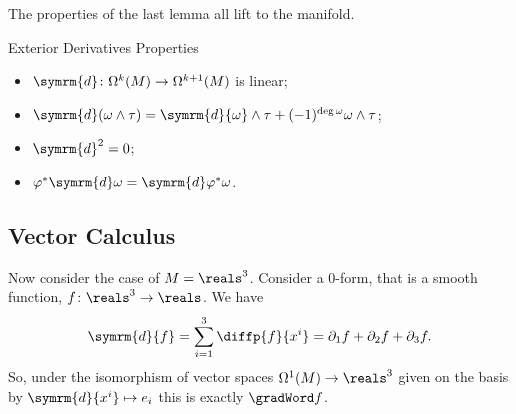 \documentclass[fleqn]{NotesClass}
\renewcommand{\dl}{\symrm{d}}
\begin{document}
    The properties of the last lemma all lift to the manifold.
    
    \begin{lma}{Exterior Derivatives Properties}{}
        \begin{itemize}
            \item \(\dl \colon \Omega^k(M) \to \Omega^{k + 1}(M)\) is linear;
            \item \(\dl(\omega \wedge \tau) = \dl{\omega} \wedge \tau + (-1)^{\deg \omega} \omega \wedge \tau\);
            \item \(\dl^2 = 0\);
            \item \(\varphi^*\dl\omega = \dl \varphi^*\omega\).
        \end{itemize}
    \end{lma}
    
    \subsection{Vector Calculus}
    Now consider the case of \(M = \reals^3\).
    Consider a 0-form, that is a smooth function, \(f \colon \reals^3 \to \reals\).
    We have
    \begin{equation}
        \dl{f} = \sum_{i=1}^{3} \diffp{f}{x^i} = \partial_1 f + \partial_2 f + \partial_3 f.
    \end{equation}
    So, under the isomorphism of vector spaces \(\Omega^1(M) \to \reals^3\) given on the basis by \(\dl{x^i} \mapsto e_i\) this is exactly \(\gradWord f\).
    
\end{document}
